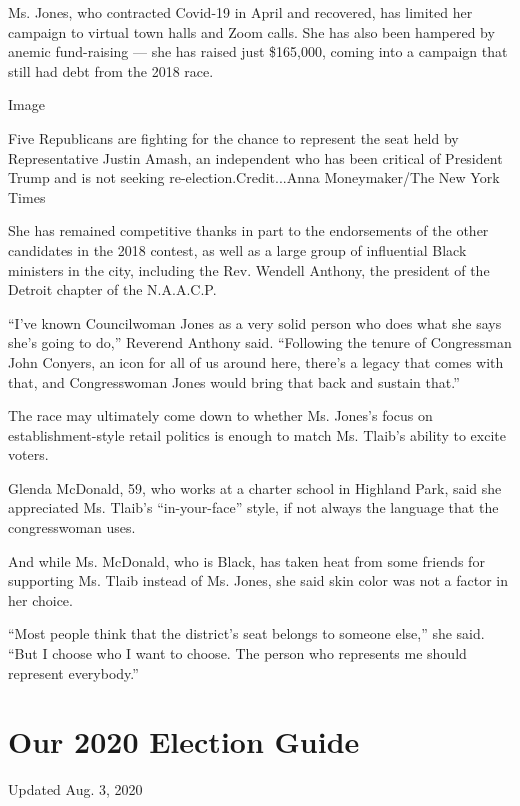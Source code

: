 Ms. Jones, who contracted Covid-19 in April and recovered, has limited
her campaign to virtual town halls and Zoom calls. She has also been
hampered by anemic fund-raising --- she has raised just \$165,000,
coming into a campaign that still had debt from the 2018 race.

Image

Five Republicans are fighting for the chance to represent the seat held
by Representative Justin Amash, an independent who has been critical of
President Trump and is not seeking re-election.Credit...Anna
Moneymaker/The New York Times

She has remained competitive thanks in part to the endorsements of the
other candidates in the 2018 contest, as well as a large group of
influential Black ministers in the city, including the Rev. Wendell
Anthony, the president of the Detroit chapter of the N.A.A.C.P.

``I've known Councilwoman Jones as a very solid person who does what she
says she's going to do,'' Reverend Anthony said. ``Following the tenure
of Congressman John Conyers, an icon for all of us around here, there's
a legacy that comes with that, and Congresswoman Jones would bring that
back and sustain that.''

The race may ultimately come down to whether Ms. Jones's focus on
establishment-style retail politics is enough to match Ms. Tlaib's
ability to excite voters.

Glenda McDonald, 59, who works at a charter school in Highland Park,
said she appreciated Ms. Tlaib's ``in-your-face'' style, if not always
the language that the congresswoman uses.

And while Ms. McDonald, who is Black, has taken heat from some friends
for supporting Ms. Tlaib instead of Ms. Jones, she said skin color was
not a factor in her choice.

``Most people think that the district's seat belongs to someone else,''
she said. ``But I choose who I want to choose. The person who represents
me should represent everybody.''

\hypertarget{our-2020-election-guide}{%
\section{Our 2020 Election Guide}\label{our-2020-election-guide}}

Updated Aug. 3, 2020

